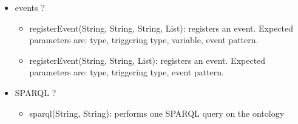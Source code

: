 \begin{itemize}
\item  events ?
\begin{itemize}
\item  registerEvent(String, String, String, List): registers an event. Expected parameters are: type, triggering type, variable, event pattern.
\item  registerEvent(String, String, List): registers an event. Expected parameters are: type, triggering type, event pattern.
\end{itemize}

\end{itemize}

\begin{itemize}
\item  SPARQL ?
\begin{itemize}
\item  sparql(String, String): performs one SPARQL query on the ontology
\end{itemize}

\end{itemize}



